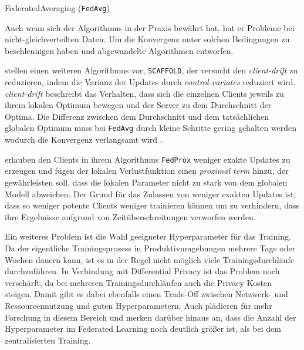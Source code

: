 \begin{algorithm}[H]\label{alg:fedavg}
	\caption{FederatedAveraging (\texttt{FedAvg})}
	
\end{algorithm}

Auch wenn sich der Algorithmus in der Praxis bewährt hat\cite{hard:2018, ramaswamy:2020}, hat er Probleme bei nicht-gleichverteilten Daten. Um die Konvergenz unter solchen Bedingungen zu beschleunigen haben \textcite{karimireddy:2020} und \textcite{li:2020} abgewandelte Algorithmen entworfen.

\textcite{karimireddy:2020} stellen einen weiteren Algorithmus vor, \texttt{SCAFFOLD}, der versucht den \textit{client-drift} zu reduzieren, indem die Varianz der Updates durch \textit{control-variates} reduziert wird. \textit{client-drift} beschreibt das Verhalten, dass sich die einzelnen Clients jeweils zu ihrem lokalen Optimum bewegen und der Server zu dem Durchschnitt der Optima. Die Differenz zwischen dem Durchschnitt und dem tatsächlichen globalen Optimum muss bei \texttt{FedAvg} durch kleine Schritte gering gehalten werden wodurch die Konvergenz verlangsamt wird \parencite[p.4]{karimireddy:2020}.

\textcite{li:2020} erlauben den Clients in ihrem Algorithmus \texttt{FedProx} weniger exakte Updates zu erzeugen und fügen der lokalen Verlustfunktion einen \textit{proximal term} hinzu, der gewährleisten soll, dass die lokalen Parameter nicht zu stark von dem globalen Modell abweichen. Der Grund für das Zulassen von weniger exakten Updates ist, dass so weniger potente Clients weniger trainieren können um zu verhindern, dass ihre Ergebnisse aufgrund von Zeitüberschreitungen verworfen werden.

Ein weiteres Problem ist die Wahl geeigneter Hyperparameter für das Training. Da der eigentliche Trainingsprozess in Produktivumgebungen mehrere Tage\cite[p.5]{hard:2018} oder Wochen\cite[p.4]{ramaswamy:2020} dauern kann, ist es in der Regel nicht möglich viele Trainingsdurchläufe durchzuführen. In Verbindung mit Differential Privacy ist das Problem noch verschärft, da bei mehreren Trainingsdurchläufen auch die Privacy Kosten steigen. Damit gibt es dabei ebenfalls einen Trade-Off zwischen Netzwerk- und Ressourcennutzung und guten Hyperparametern. Auch \textcite[p.31]{kairouz:2021} plädieren für mehr Forschung in diesem Bereich und merken darüber hinaus an, dass die Anzahl der Hyperparameter im Federated Learning noch deutlich größer ist, als bei dem zentralisierten Training.

